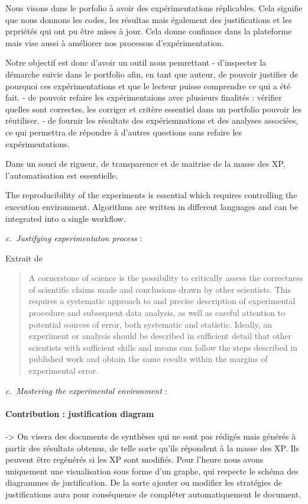 \documentclass{llncs}
\newcounter{NoReq}
\newcommand{\req}[3]{\refstepcounter{NoReq} \textit{c.\theNoReq~{#2}}\label{#1} : {#3}}
\begin{document}
Nous visons dans le porfolio à avoir des expérimentations réplicables.
Cela signifie que nous donnons les codes, les résultas mais également des justifications et les prpriétés qui ont pu être mises à jour.
Cela donne confiance dans la plateforme mais vise aussi à améliorer nos processus d'expérimentation.

Notre objectif est donc d'avoir un outil nous pemrettant  
- d'inspecter la démarche suivie dans le portfolio afin, en tant que auteur, de pouvoir justifier de pourquoi ces expérimentations et que le lecteur puisse comprendre ce qui a été fait.
-   de pouvoir refaire les expérimentaions avec plusieurs finalités : vérifier quelles sont correctes, les corriger et critère essentiel dans un portfolio pouvoir les réutiliser.
- de fournir les résultats des expériemnations et des analyses associées, ce qui permettra de répondre à d'autres questions sans refaire les expérimentations.

Dans un souci de rigueur, de transparence et de maitrise de la masse des XP, l'automatisation est essentielle. 


The reproducibility of the experiments \cite{REF} is essential which requires controlling the execution environment. Algorithms are written in different languages and can be integrated into a single workflow. 

\req{justifications}{Justifying experimentaton process}{
Extrait de \cite{10.3389/fninf.2017.00076} 
\begin{quote}
    A cornerstone of science is the possibility to critically assess the correctness of scientific claims made and conclusions drawn by other scientists. This requires a systematic approach to and precise description of experimental procedure and subsequent data analysis, as well as careful attention to potential sources of error, both systematic and statistic. Ideally, an experiment or analysis should be described in sufficient detail that other scientists with sufficient skills and means can follow the steps described in published work and obtain the same results within the margins of experimental error. 
\end{quote}
}

\req{replicability}{Mastering the experimental environment}{
}

\paragraph{Contribution : justification diagram}
-> On visera des documents de synthèses qui ne sont pas rédigés mais générés à partir des résultats obtenus, de telle sorte qu'ils répondent à la masse des XP. Ils peuvent être regénérés si les XP sont modifiés.
Pour l'heure nous avons uniquement une visualisation sous forme d'un graphe, qui respecte le schéma des diagrammes de justification.
De la sorte ajouter ou modifier les stratégies de justifications aura pour conséquence de compléter automatiquement le document.
\end{document}
